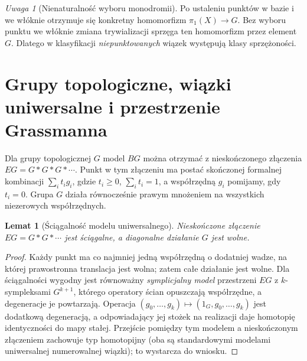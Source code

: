 \documentclass[11pt,a4paper,oneside]{report}
\theoremstyle{plain}
\newtheorem{lemat}[twierdzenie]{Lemat}
\theoremstyle{definition}
\theoremstyle{remark}
\newtheorem{uwaga}[twierdzenie]{Uwaga}
\begin{document}
\begin{uwaga}[Nienaturalność wyboru monodromii]
Po ustaleniu punktów w bazie i we włóknie otrzymuje się
konkretny homomorfizm $\pi_1(X)\to G$.
Bez wyboru punktu we włóknie zmiana trywializacji
sprzęga ten homomorfizm przez element $G$.
Dlatego w klasyfikacji \emph{niepunktowanych} wiązek
występują klasy sprzężoności.
\end{uwaga}

\section{Grupy topologiczne, wiązki uniwersalne i przestrzenie Grassmanna}
Dla grupy topologicznej $G$ model $BG$ można otrzymać
z nieskończonego złączenia $EG=G*G*G*\cdots$.
Punkt w tym złączeniu ma postać skończonej formalnej
kombinacji $\sum_i t_i g_i$, gdzie $t_i\ge0$,
$\sum_i t_i=1$, a współrzędną $g_i$ pomijamy,
gdy $t_i=0$. Grupa $G$ działa równocześnie prawym
mnożeniem na wszystkich niezerowych współrzędnych.

\begin{lemat}[Ściągalność modelu uniwersalnego]
Nieskończone złączenie $EG=G*G*\cdots$ jest ściągalne,
a diagonalne działanie $G$ jest wolne.
\end{lemat}
\begin{proof}
Każdy punkt ma co najmniej jedną współrzędną
o dodatniej wadze, na której prawostronna translacja
jest wolna; zatem całe działanie jest wolne.
Dla ściągalności wygodny jest równoważny
\emph{symplicjalny model} przestrzeni $EG$ z
$k$-sympleksami $G^{k+1}$, którego operatory ścian
opuszczają współrzędne, a degeneracje je powtarzają.
Operacja
$(g_0,\ldots,g_k)\mapsto(1_G,g_0,\ldots,g_k)$
jest dodatkową degeneracją, a odpowiadający jej
stożek na realizacji daje homotopię identyczności
do mapy stałej. Przejście pomiędzy tym modelem
a nieskończonym złączeniem zachowuje typ homotopijny
(oba są standardowymi modelami uniwersalnej
numerowalnej wiązki); to wystarcza do wniosku.
\end{proof}
\end{document}
